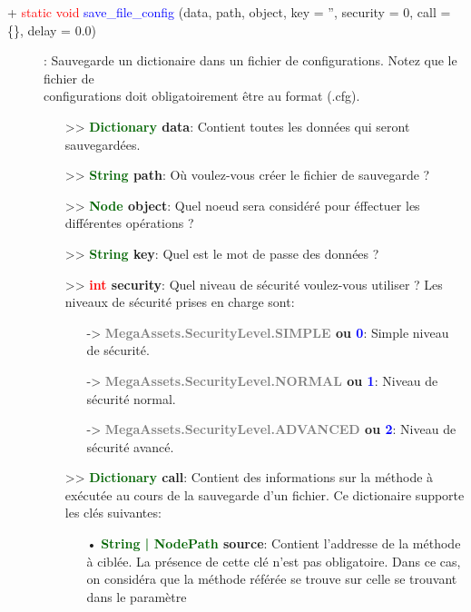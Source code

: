 \documentclass[a4paper, 11pt]{article}
\begin{document}
	\begin{description}
		\item [+ \textcolor{red}{static void} \textcolor{blue}{save\_file\_config} (data, path, object, key 
		= '', security = 0, call = \{\}, delay = 0.0)]: Sauvegarde un dictionaire dans un fichier de 
		configurations. Notez que le fichier de \\configurations doit obligatoirement être au format (.cfg).
		\begin{itemize}
			\item [>> \textbf{\textcolor{darkgreen}{Dictionary} data}:] Contient toutes les données qui 
			seront sauvegardées.
			\item [>> \textbf{\textcolor{darkgreen}{String} path}:] Où voulez-vous créer le fichier de 
			sauvegarde ?
			\item [>> \textbf{\textcolor{darkgreen}{Node} object}:] Quel noeud sera considéré pour éffectuer
			les différentes opérations ?
			\item [>> \textbf{\textcolor{darkgreen}{String} key}:] Quel est le mot de passe des données ?
			\item [>> \textbf{\textcolor{red}{int} security}:] Quel niveau de sécurité voulez-vous utiliser 
			? Les niveaux de sécurité prises en charge sont:
			\begin{itemize}
				\item [-> \textbf{\textcolor{gray}{MegaAssets.SecurityLevel.SIMPLE} ou \textcolor{blue}
				{0}}:] Simple niveau de sécurité.
				\item [-> \textbf{\textcolor{gray}{MegaAssets.SecurityLevel.NORMAL} ou \textcolor{blue}
				{1}}:] Niveau de sécurité normal.
				\item [-> \textbf{\textcolor{gray}{MegaAssets.SecurityLevel.ADVANCED} ou \textcolor{blue}
				{2}}:] Niveau de sécurité avancé.
			\end{itemize}
			\item [>> \textbf{\textcolor{darkgreen}{Dictionary} call}:] Contient des informations sur la
			méthode à exécutée au cours de la sauvegarde d'un fichier. Ce dictionaire supporte les clés
			suivantes:
			\begin{itemize}
			   \item[• \textbf{\textcolor{darkgreen}{String | NodePath} source}:] Contient l'addresse de la
			   méthode à ciblée. La présence de cette clé n'est pas obligatoire. Dans ce cas, on considéra
			   que la méthode référée se trouve sur celle se trouvant dans le paramètre

\end{itemize}
\end{itemize}
\end{description}
\end{document}
